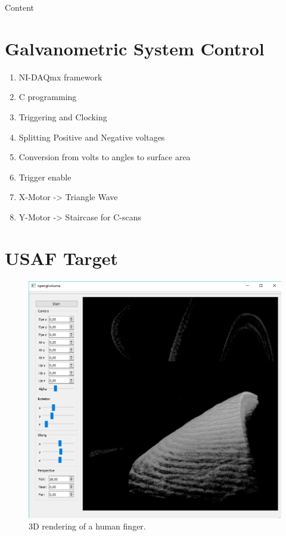 Content


\section{Galvanometric System Control}
	\begin{enumerate}
		\item NI-DAQmx framework
		\item C programming
		\item Triggering and Clocking
		\item Splitting Positive and Negative voltages
		\item Conversion from volts to angles to surface area
		\item Trigger enable
		\item X-Motor -> Triangle Wave
		\item Y-Motor -> Staircase for C-scans		
	\end{enumerate}

\section{USAF Target}
    \begin{figure}[hbt]
        \centering
        \includegraphics[width=0.8\linewidth]{gfx/3d/finger}
        \caption[]{3D rendering of a human finger.}\label{fig:finger-3d}
    \end{figure}

